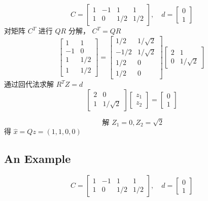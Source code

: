 \begin{example}
    $$
C=\left[\begin{array}{cccc}
1 & -1 & 1 & 1 \\
1 & 0 & 1 / 2 & 1 / 2
\end{array}\right], \quad d=\left[\begin{array}{l}
0 \\
1
\end{array}\right]
$$
对矩阵 $ C^{T} $ 进行 $ Q R $ 分解， $ C^{T}=Q R $
$$
\left[\begin{array}{cc}
1 & 1 \\
-1 & 0 \\
1 & 1 / 2 \\
1 & 1 / 2
\end{array}\right]=\left[\begin{array}{cc}
1 / 2 & 1 / \sqrt{2} \\
-1 / 2 & 1 / \sqrt{2} \\
1 / 2 & 0 \\
1 / 2 & 0
\end{array}\right]\left[\begin{array}{cc}
2 & 1 \\
0 & 1 / \sqrt{2}
\end{array}\right]
$$
通过回代法求解 $ R^{T} Z=d $
$$
\left[\begin{array}{cc}
2 & 0 \\
1 & 1 / \sqrt{2}
\end{array}\right]\left[\begin{array}{l}
z_{1} \\
z_{2}
\end{array}\right]=\left[\begin{array}{l}
0 \\
1
\end{array}\right]
$$

$$
\text { 解 } Z_{1}=0, Z_{2}=\sqrt{2}
$$
得 $ \hat{x}=Q z=(1,1,0,0) $
\end{example}

\subsection{An Example}

\begin{example}
    $$ C=\left[\begin{array}{cccc}1 & -1 & 1 & 1 \\ 1 & 0 & 1 / 2 & 1 / 2\end{array}\right], \quad d=\left[\begin{array}{l}0 \\ 1\end{array}\right] $$
\end{example}


